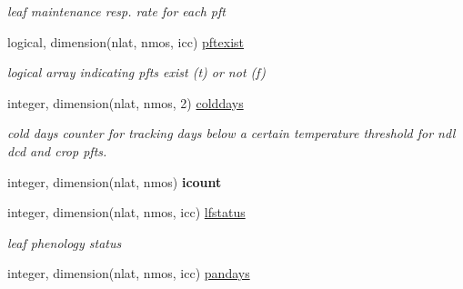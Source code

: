 \begin{DoxyCompactItemize}
\begin{DoxyCompactList}\small\item\em leaf maintenance resp. rate for each pft \end{DoxyCompactList}\item 
\hypertarget{structctem__statevars_1_1veg__rot_ada8413d2cf1b2248ab9f65414d42f959}{}logical, dimension(nlat, nmos, icc) \hyperlink{structctem__statevars_1_1veg__rot_ada8413d2cf1b2248ab9f65414d42f959}{pftexist}\label{structctem__statevars_1_1veg__rot_ada8413d2cf1b2248ab9f65414d42f959}

\begin{DoxyCompactList}\small\item\em logical array indicating pfts exist (t) or not (f) \end{DoxyCompactList}\item 
\hypertarget{structctem__statevars_1_1veg__rot_afb7b370a77d58a160552507121d6da3e}{}integer, dimension(nlat, nmos, 2) \hyperlink{structctem__statevars_1_1veg__rot_afb7b370a77d58a160552507121d6da3e}{colddays}\label{structctem__statevars_1_1veg__rot_afb7b370a77d58a160552507121d6da3e}

\begin{DoxyCompactList}\small\item\em cold days counter for tracking days below a certain temperature threshold for ndl dcd and crop pfts. \end{DoxyCompactList}\item 
\hypertarget{structctem__statevars_1_1veg__rot_af822c9d22971382570e602015b27c8f3}{}integer, dimension(nlat, nmos) {\bfseries icount}\label{structctem__statevars_1_1veg__rot_af822c9d22971382570e602015b27c8f3}

\item 
\hypertarget{structctem__statevars_1_1veg__rot_a1193dbd4a8c0e9d08fd4e432f28b3741}{}integer, dimension(nlat, nmos, icc) \hyperlink{structctem__statevars_1_1veg__rot_a1193dbd4a8c0e9d08fd4e432f28b3741}{lfstatus}\label{structctem__statevars_1_1veg__rot_a1193dbd4a8c0e9d08fd4e432f28b3741}

\begin{DoxyCompactList}\small\item\em leaf phenology status \end{DoxyCompactList}\item 
\hypertarget{structctem__statevars_1_1veg__rot_a1135648e62a6dca1005c33b42df05084}{}integer, dimension(nlat, nmos, icc) \hyperlink{structctem__statevars_1_1veg__rot_a1135648e62a6dca1005c33b42df05084}{pandays}\label{structctem__statevars_1_1veg__rot_a1135648e62a6dca1005c33b42df05084}


\end{DoxyCompactItemize}
